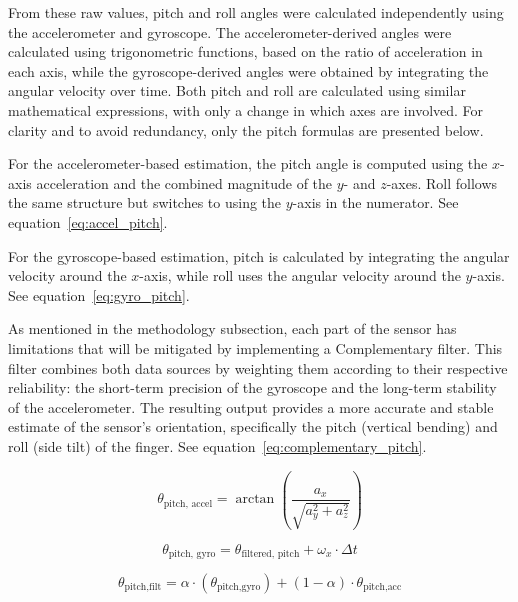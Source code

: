 From these raw values, pitch and roll angles were calculated independently using the accelerometer and gyroscope. The accelerometer-derived angles were calculated using trigonometric functions, based on the ratio of acceleration in each axis, while the gyroscope-derived angles were obtained by integrating the angular velocity over time. Both pitch and roll are calculated using similar mathematical expressions, with only a change in which axes are involved. For clarity and to avoid redundancy, only the pitch formulas are presented below.

For the accelerometer-based estimation, the pitch angle is computed using the $x$-axis acceleration and the combined magnitude of the $y$- and $z$-axes. Roll follows the same structure but switches to using the $y$-axis in the numerator. See equation~\ref{eq:accel_pitch}.

For the gyroscope-based estimation, pitch is calculated by integrating the angular velocity around the $x$-axis, while roll uses the angular velocity around the $y$-axis. See equation~\ref{eq:gyro_pitch}.

As mentioned in the methodology subsection, each part of the sensor has limitations that will be mitigated by implementing a Complementary filter. This filter combines both data sources by weighting them according to their respective reliability: the short-term precision of the gyroscope and the long-term stability of the accelerometer. The resulting output provides a more accurate and stable estimate of the sensor's orientation, specifically the pitch (vertical bending) and roll (side tilt) of the finger. See equation~\ref{eq:complementary_pitch}.

\begin{equation}
\theta_{\text{pitch, accel}} = \arctan\left( \frac{a_x}{\sqrt{a_y^2 + a_z^2}} \right)
\label{eq:accel_pitch}
\end{equation}

\begin{equation}
\theta_{\text{pitch, gyro}} = \theta_{\text{filtered, pitch}} + \omega_x \cdot \Delta t
\label{eq:gyro_pitch}
\end{equation}

\begin{equation}
\theta_{\text{pitch,filt}} = \alpha \cdot (\theta_{\text{pitch,gyro}}) + (1 - \alpha) \cdot \theta_{\text{pitch,acc}}
\label{eq:complementary_pitch}
\end{equation}

